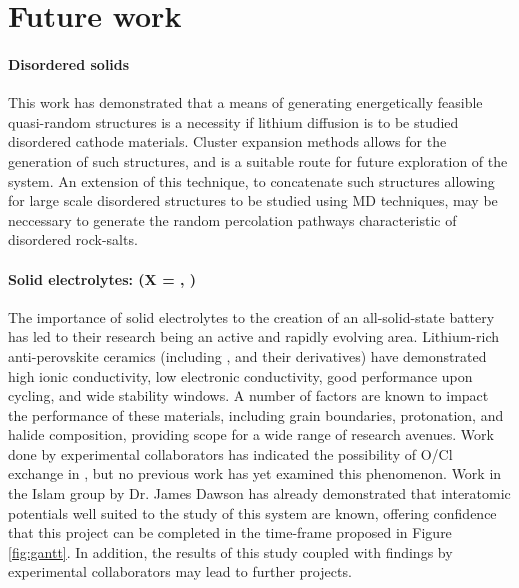 \section{Future work}
\paragraph{Disordered solids}
This work has demonstrated that a means of generating energetically feasible quasi-random structures is a necessity if lithium diffusion is to be studied disordered cathode materials.
Cluster expansion methods\cite{Chang2019} allows for the generation of such structures, and is a suitable route for future exploration of the system.
An extension of this technique, to concatenate such structures allowing for large scale disordered structures to be studied using MD techniques, may be neccessary to generate the random percolation pathways characteristic of disordered rock-salts.

\paragraph{Solid electrolytes:  (X = , )}
The importance of solid electrolytes to the creation of an all-solid-state battery has led to their research being an active and rapidly evolving area.
Lithium-rich anti-perovskite ceramics (including ,  and their derivatives)\cite{Zhao2012} have demonstrated high ionic conductivity, low electronic conductivity, good performance upon cycling, and wide stability windows.
A number of factors are known to impact the performance of these materials, including grain boundaries,\cite{Dawson2018} protonation,\cite{Dawson2018a} and halide composition,\cite{Dawson2018b} providing scope for a wide range of research avenues.
Work done by experimental collaborators has indicated the possibility of O/Cl exchange in , but no previous work has yet examined this phenomenon.
Work in the Islam group by Dr. James Dawson has already demonstrated that interatomic potentials well suited to the study of this system are known, offering confidence that this project can be completed in the time-frame proposed in Figure \ref{fig:gantt}.
In addition, the results of this study coupled with findings by experimental collaborators may lead to further projects.



